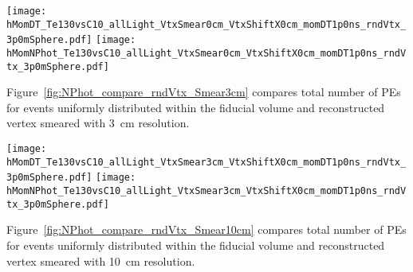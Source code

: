 \begin{figure*}[ht]
  \centering
  \texttt{[image: hMomDT\_Te130vsC10\_allLight\_VtxSmear0cm\_VtxShiftX0cm\_momDT1p0ns\_rndVtx\_3p0mSphere.pdf]}
  \texttt{[image: hMomNPhot\_Te130vsC10\_allLight\_VtxSmear0cm\_VtxShiftX0cm\_momDT1p0ns\_rndVtx\_3p0mSphere.pdf]}
  \caption{(Left) Difference between measured PE arrival time and arrival time prediction based on 
	vertex location (T$^{predicted} = |r_{hit} - r_{vtx}|/v_{phot}$, where $v_phot = c/1.53$).
        $\vbb$-decay (black solid line) and $\Cten$ events (magenta dashed line) are compared. 
	Vertical line at 1~ns indicates cut for early light selection. 
        (Right) Total number of PEs in the early light sample. 
        $^{10}$C events with energy deposition in the 10\% energy range around Q-value are
	selected. Verticies are uniformly distributed within the fiducial volume, $R<3$~m.
        {\bf Perfect vertex reconstruction - true vertex position is used.}}
\label{fig:NPhot_compare_rndVtx_noSmear}
\end{figure*}


Figure~\ref{fig:NPhot_compare_rndVtx_Smear3cm} compares total number of PEs for events uniformly
distributed within the fiducial volume and reconstructed vertex smeared with 3~cm resolution.

\begin{figure*}[ht]
  \centering
  \texttt{[image: hMomDT\_Te130vsC10\_allLight\_VtxSmear3cm\_VtxShiftX0cm\_momDT1p0ns\_rndVtx\_3p0mSphere.pdf]}
  \texttt{[image: hMomNPhot\_Te130vsC10\_allLight\_VtxSmear3cm\_VtxShiftX0cm\_momDT1p0ns\_rndVtx\_3p0mSphere.pdf]}
  \caption{(Left) Difference between measured PE arrival time and arrival time prediction based on
        vertex location (T$^{predicted} = |r_{hit} - r_{vtx}|/v_{phot}$, where $v_phot = c/1.53$).
        $\vbb$-decay (black solid line) and $\Cten$ events (magenta dashed line) are compared.
        Vertical line at 1~ns indicates cut for early light selection.
        (Right) Total number of PEs in the early light sample.
        $^{10}$C events with energy deposition in the 10\% energy range around Q-value are
        selected. Verticies are uniformly distributed within the fiducial volume, $R<3$~m.
        {\bf Vetrex is smeared with 3~cm resolution.}}
\label{fig:NPhot_compare_rndVtx_Smear3cm}
\end{figure*}


Figure~\ref{fig:NPhot_compare_rndVtx_Smear10cm} compares total number of PEs for events uniformly
distributed within the fiducial volume and reconstructed vertex smeared with 10~cm resolution.

